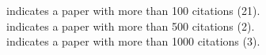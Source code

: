 \noindent  \onestar indicates a paper with more than 100 citations (21). \\
 \threestars indicates a paper with more than 500 citations (2). \\
  \fourstars indicates a paper with more than 1000 citations (3).
  

\phantom{A}
\newline


\begin{enumerate}












\end{enumerate}
